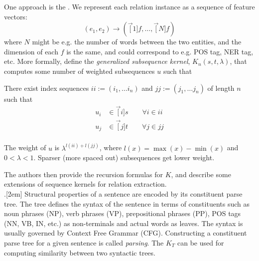 \documentclass[11pt]{article}
\begin{document}
One approach is the . We represent each relation instance as a sequence of feature vectors:
$$
(e_1, e_2) \rightarrow (\vec[1]{f}, \ldots, \vec[N]{f})
$$
where $N$ might be e.g. the number of words between the two entities, and the dimension of each $f$ is the same, and could correspond to e.g. POS tag, NER tag, etc. More formally, define the \textit{generalized subsequence kernel}, $K_n(s, t, \lambda)$, that computes some number of weighted subsequences $u$ such that
\begin{compactitem}
	\item There exist index sequences $ii := (i_1, \ldots i_n)$ and $jj := (j_1, \ldots j_n)$ of length $n$ such that 
	\begin{align}
	u_i &\in \vec[i]{s} \qquad \forall i \in  ii \\
	u_j &\in \vec[j]{t} \qquad \forall j \in jj \\ 
	\end{align}
	
	\item The weight of $u$ is $\lambda^{l(ii) + l(jj)}$, where $l(x) = \max(x) - \min(x)$ and $0 < \lambda < 1$. Sparser (more spaced out) subsequences get lower weight.
\end{compactitem}
The authors then provide the recursion formulas for $K$, and describe some extensions of sequence kernels for relation extraction.\\


.[2em] Structural properties of a sentence are encoded by its constituent parse tree. The tree defines the syntax of the sentence in terms of constituents such as noun phrases (NP), verb phrases (VP), prepositional phrases (PP), POS tags (NN, VB, IN, etc.) as non-terminals and actual words as leaves. The syntax is usually governed by Context Free Grammar (CFG). Constructing a constituent parse tree for a given sentence is called \textit{parsing}. The  $K_T$ can be used for computing similarity between two syntactic trees.\\
\end{document}
